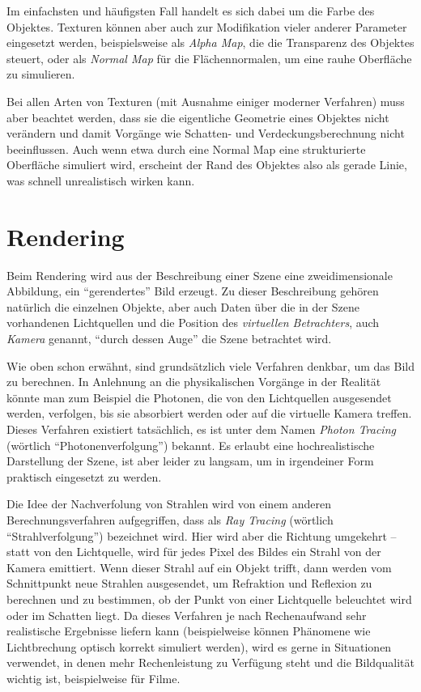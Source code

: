 
Im einfachsten und häufigsten Fall handelt es sich dabei um die Farbe des Objektes. Texturen können aber auch zur Modifikation vieler anderer Parameter eingesetzt werden, beispielsweise als \emph{Alpha Map}, die die Transparenz des Objektes steuert, oder als \emph{Normal Map} für die Flächennormalen, um eine rauhe Oberfläche zu simulieren.

Bei allen Arten von Texturen (mit Ausnahme einiger moderner Verfahren) muss aber beachtet werden, dass sie die eigentliche Geometrie eines Objektes nicht verändern und damit Vorgänge wie Schatten- und Verdeckungsberechnung nicht beeinflussen. Auch wenn etwa durch eine Normal Map eine strukturierte Oberfläche simuliert wird, erscheint der Rand des Objektes also als gerade Linie, was schnell unrealistisch wirken kann.

\section{Rendering}
\label{rendering}
Beim Rendering wird aus der Beschreibung einer Szene eine zweidimensionale Abbildung, ein \enquote{gerendertes} Bild erzeugt. Zu dieser Beschreibung gehören natürlich die einzelnen Objekte, aber auch Daten über die in der Szene vorhandenen Lichtquellen und die Position des \emph{virtuellen Betrachters}, auch \emph{Kamera} genannt, \enquote{durch dessen Auge} die Szene betrachtet wird.

Wie oben schon erwähnt, sind grundsätzlich viele Verfahren denkbar, um das Bild zu berechnen. In Anlehnung an die physikalischen Vorgänge in der Realität könnte man zum Beispiel die Photonen, die von den Lichtquellen ausgesendet werden, verfolgen, bis sie absorbiert werden oder auf die virtuelle Kamera treffen. Dieses Verfahren existiert tatsächlich, es ist unter dem Namen \emph{Photon Tracing} (wörtlich \enquote{Photonenverfolgung}) bekannt. Es erlaubt eine hochrealistische Darstellung der Szene, ist aber leider zu langsam, um in irgendeiner Form praktisch eingesetzt zu werden.

Die Idee der Nachverfolung von Strahlen wird von einem anderen Berechnungsverfahren aufgegriffen, dass als \emph{Ray Tracing} (wörtlich \enquote{Strahlverfolgung}) bezeichnet wird. Hier wird aber die Richtung umgekehrt -- statt von den Lichtquelle, wird für jedes Pixel des Bildes ein Strahl von der Kamera emittiert. Wenn dieser Strahl auf ein Objekt trifft, dann werden vom Schnittpunkt neue Strahlen ausgesendet, um Refraktion und Reflexion zu berechnen und zu bestimmen, ob der Punkt von einer Lichtquelle beleuchtet wird oder im Schatten liegt. Da dieses Verfahren je nach Rechenaufwand sehr realistische Ergebnisse liefern kann (beispielweise können Phänomene wie Lichtbrechung optisch korrekt simuliert werden), wird es gerne in Situationen verwendet, in denen mehr Rechenleistung zu Verfügung steht und die Bildqualität wichtig ist, beispielweise für Filme.

